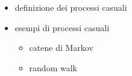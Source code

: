 
\begin{itemize}
  \item definizione dei processi casuali
  \item esempi di processi casuali
  \begin{itemize}
    \item catene di Markov
    \item random walk
  \end{itemize}
\end{itemize}
